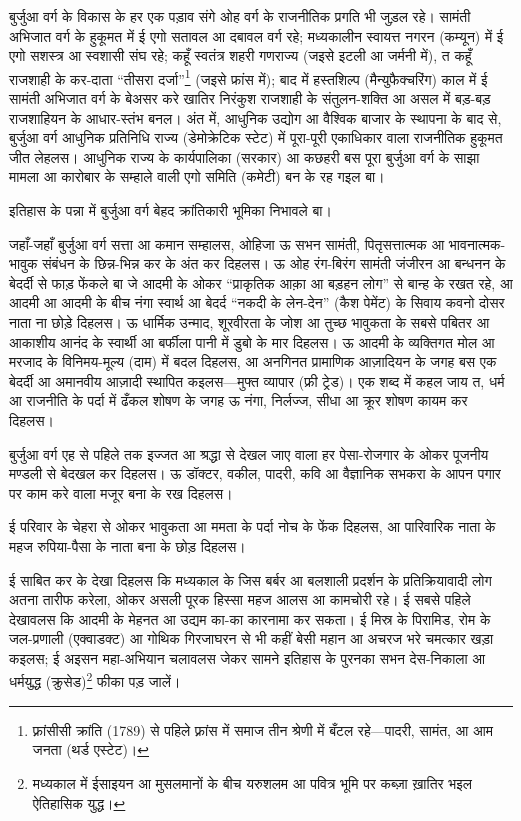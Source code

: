 \documentclass[12pt,a4paper,oneside]{book}
\begin{document}
बुर्जुआ वर्ग के विकास के हर एक पड़ाव संगे ओह वर्ग के राजनीतिक प्रगति भी जुड़ल रहे। सामंती अभिजात वर्ग के हुकूमत में ई एगो सतावल आ दबावल वर्ग रहे; मध्यकालीन स्वायत्त नगरन (कम्यून) में ई एगो सशस्त्र आ स्वशासी संघ रहे; कहूँ स्वतंत्र शहरी गणराज्य (जइसे इटली आ जर्मनी में), त कहूँ राजशाही के कर-दाता “तीसरा दर्जा”\footnote{फ़्रांसीसी क्रांति {\engfont (1789)} से पहिले फ़्रांस में समाज तीन श्रेणी में बँटल रहे—पादरी, सामंत, आ आम जनता (थर्ड एस्टेट)।} (जइसे फ्रांस में); बाद में हस्तशिल्प (मैन्युफैक्चरिंग) काल में ई सामंती अभिजात वर्ग के बेअसर करे खातिर निरंकुश राजशाही के संतुलन-शक्ति आ असल में बड़-बड़ राजशाहियन के आधार-स्तंभ बनल। अंत में, आधुनिक उद्योग आ वैश्विक बाजार के स्थापना के बाद से, बुर्जुआ वर्ग आधुनिक प्रतिनिधि राज्य (डेमोक्रेटिक स्टेट) में पूरा-पूरी एकाधिकार वाला राजनीतिक हुकूमत जीत लेहलस। आधुनिक राज्य के कार्यपालिका (सरकार) आ कछहरी बस पूरा बुर्जुआ वर्ग के साझा मामला आ कारोबार के सम्हाले वाली एगो समिति (कमेटी) बन के रह गइल बा।

इतिहास के पन्ना में बुर्जुआ वर्ग बेहद क्रांतिकारी भूमिका निभावले बा।

जहाँ-जहाँ बुर्जुआ वर्ग सत्ता आ कमान सम्हालस, ओहिजा ऊ सभन सामंती, पितृसत्तात्मक आ भावनात्मक-भावुक संबंधन के छिन्न-भिन्न कर के अंत कर दिहलस। ऊ ओह रंग-बिरंग सामंती जंजीरन आ बन्धनन के बेदर्दी से फाड़ फेंकले बा जे आदमी के ओकर “प्राकृतिक आक़ा आ बड़हन लोग” से बान्ह के रखत रहे, आ आदमी आ आदमी के बीच नंगा स्वार्थ आ बेदर्द “नकदी के लेन-देन” (कैश पेमेंट) के सिवाय कवनो दोसर नाता ना छोड़े दिहलस। ऊ धार्मिक उन्माद, शूरवीरता के जोश आ तुच्छ भावुकता के सबसे पबितर आ आकाशीय आनंद के स्वार्थी आ बर्फीला पानी में डुबो के मार दिहलस। ऊ आदमी के व्यक्तिगत मोल आ मरजाद के विनिमय-मूल्य (दाम) में बदल दिहलस, आ अनगिनत प्रामाणिक आज़ादियन के जगह बस एक बेदर्दी आ अमानवीय आज़ादी स्थापित कइलस—मुफ्त व्यापार (फ्री ट्रेड)। एक शब्द में कहल जाय त, धर्म आ राजनीति के पर्दा में ढँकल शोषण के जगह ऊ नंगा, निर्लज्ज, सीधा आ क्रूर शोषण कायम कर दिहलस।

बुर्जुआ वर्ग एह से पहिले तक इज्जत आ श्रद्धा से देखल जाए वाला हर पेसा-रोजगार के ओकर पूजनीय मण्डली से बेदखल कर दिहलस। ऊ डॉक्टर, वकील, पादरी, कवि आ वैज्ञानिक सभकरा के आपन पगार पर काम करे वाला मजूर बना के रख दिहलस।

ई परिवार के चेहरा से ओकर भावुकता आ ममता के पर्दा नोच के फेंक दिहलस, आ पारिवारिक नाता के महज रुपिया-पैसा के नाता बना के छोड़ दिहलस।

ई साबित कर के देखा दिहलस कि मध्यकाल के जिस बर्बर आ बलशाली प्रदर्शन के प्रतिक्रियावादी लोग अतना तारीफ करेला, ओकर असली पूरक हिस्सा महज आलस आ कामचोरी रहे। ई सबसे पहिले देखावलस कि आदमी के मेहनत आ उद्यम का-का कारनामा कर सकता। ई मिस्र के पिरामिड, रोम के जल-प्रणाली (एक्वाडक्ट) आ गोथिक गिरजाघरन से भी कहीं बेसी महान आ अचरज भरे चमत्कार खड़ा कइलस; ई अइसन महा-अभियान चलावलस जेकर सामने इतिहास के पुरनका सभन देस-निकाला आ धर्मयुद्ध (क्रुसेड)\footnote{मध्यकाल में ईसाइयन आ मुसलमानों के बीच यरुशलम आ पवित्र भूमि पर कब्ज़ा ख़ातिर भइल ऐतिहासिक युद्ध।} फीका पड़ जालें।
\end{document}
